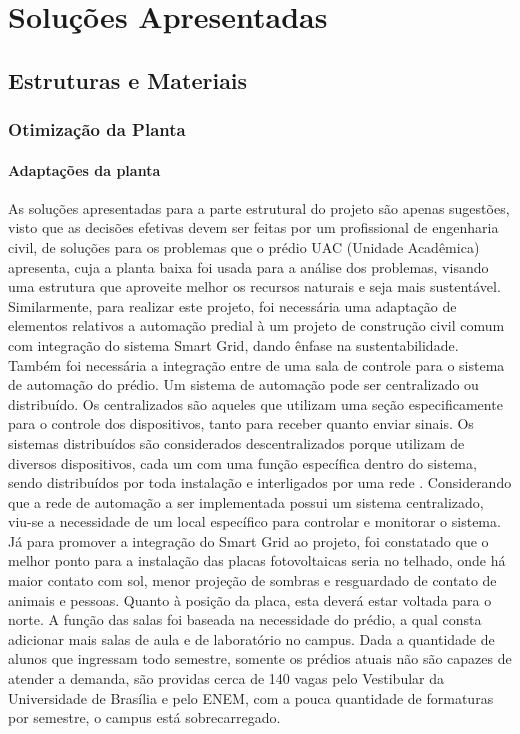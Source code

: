 \part{Soluções Apresentadas}
\label{sol}
\chapter[Estruturas e Materiais]{Estruturas e Materiais}

\section{Otimização da Planta}
\subsection{Adaptações da planta}
As soluções apresentadas para a parte estrutural do projeto são apenas sugestões, visto que as decisões efetivas devem ser feitas por um profissional de engenharia civil, de soluções para os problemas que o prédio UAC (Unidade Acadêmica) apresenta, cuja a planta baixa foi usada para a análise dos problemas, visando uma estrutura que aproveite melhor os recursos naturais e seja mais sustentável.
Similarmente, para realizar este projeto, foi necessária uma adaptação de elementos relativos a automação predial à um projeto de construção civil comum com integração do sistema Smart Grid, dando ênfase na sustentabilidade. Também foi necessária a integração entre de uma sala de controle para o sistema de automação do prédio.
Um sistema de automação pode ser centralizado ou distribuído. Os centralizados são aqueles que utilizam uma seção especificamente para o controle dos dispositivos, tanto para receber quanto enviar sinais. Os sistemas distribuídos são considerados descentralizados porque utilizam de diversos dispositivos, cada um com uma função específica dentro do sistema, sendo distribuídos por toda instalação e interligados por uma rede \cite{dias2004}.
Considerando que a rede de automação a ser implementada possui um sistema centralizado, viu-se a necessidade de um local específico para controlar e monitorar o sistema. Já para promover a integração do Smart Grid ao projeto, foi constatado que o melhor ponto para a instalação das placas fotovoltaicas seria no telhado, onde há maior contato com sol, menor projeção de sombras e resguardado de contato de animais e pessoas. Quanto à posição da placa, esta deverá estar voltada para o norte.
A função das salas foi baseada na necessidade do prédio, a qual consta adicionar mais salas de aula e de laboratório no campus. Dada a quantidade de alunos que ingressam todo semestre, somente os prédios atuais não são capazes de atender a demanda, são providas cerca de 140 vagas pelo Vestibular da Universidade de Brasília e pelo ENEM, com a pouca quantidade de formaturas por semestre, o campus está sobrecarregado.
